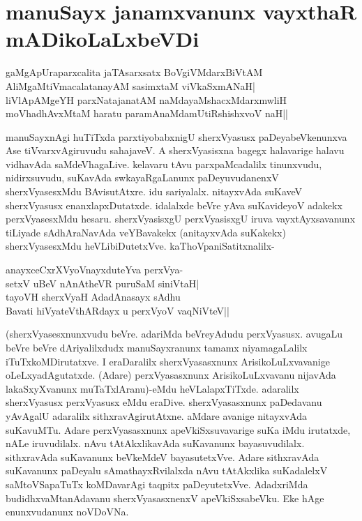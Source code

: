 \chapter{manuSayx janamxvanunx vayxthaR mADikoLaLxbeVDi}\label{chap6}

\begin{shloka}
gaMgApUraparxcalita jaTAsarxsatx BoVgiVMdarxBiVtAM\\
AliMgaMtiVmacalatanayAM sasimxtaM viVkaSxmANaH|\\
liVlApAMgeYH parxNatajanatAM naMdayaMshacxMdarxmwliH\\
moVhadhAvxMtaM haratu paramAnaMdamUtiRshishxvoV naH||
\end{shloka}

manuSayxnAgi huTiTxda parxtiyobabxnigU sherxVyasusx paDeyabeVkenunxva Ase tiVvarxvAgiruvudu sahajaveV. A sherxVyasisxna bagegx halavarige halavu vidhavAda saMdeVhagaLive. kelavaru tAvu parxpaMcadalilx tinunxvudu, nidirxsuvudu, suKavAda swkayaRgaLanunx paDeyuvudanenxV sherxVyasesxMdu BAvisutAtxre. idu sariyalalx. nitayxvAda suKaveV sherxVyasusx enanxlapxDutatxde. idalalxde beVre yAva suKavideyoV adakekx perxVyasesxMdu hesaru. sherxVyasisxgU perxVyasisxgU iruva vayxtAyxsavanunx tiLiyade sAdhAraNavAda veYBavakekx (anitayxvAda suKakekx) sherxVyasesxMdu heVLibiDutetxVve. kaThoVpaniSatitxnalilx-

\begin{shloka}
anayxceCxrXVyoV\s nayxduteYva perxVya-\\
setxV uBeV nAnAtheVR puruSaM siniVtaH|\\
tayoVH sherxVyaH AdadAnasayx sAdhu\\
Bavati hiVyateV\s thARdayx u perxVyoV vaqNiVteV||
\end{shloka}

(sherxVyasesxnunxvudu beVre. adariMda beVreyAdudu perxVyasusx. avugaLu beVre beVre dAriyalilxdudx manuSayxranunx tamamx niyamagaLalilx iTuTxkoMDirutatxve. I eraDaralilx sherxVyasasxnunx ArisikoLuLxvavanige oLeLxyadAgutatxde. (Adare) perxVyasasxnunx ArisikoLuLxvavanu nijavAda lakaSxyXvanunx muTaTxlAranu)-eMdu heVLalapxTiTxde. adaralilx sherxVyasusx perxVyasusx eMdu eraDive. sherxVyasasxnunx paDedavanu yAvAgalU adaralilx sithxravAgirutAtxne. aMdare avanige nitayxvAda suKavuMTu. Adare perxVyasasxnunx apeVkiSxsuvavarige suKa iMdu irutatxde, nALe iruvudilalx. nAvu tAtAkxlikavAda suKavanunx bayasuvudilalx. sithxravAda suKavanunx beVkeMdeV bayasutetxVve. Adare sithxravAda suKavanunx paDeyalu sAmathayxRvilalxda nAvu tAtAkxlika suKadalelxV saMtoVSapaTuTx koMDavarAgi taqpitx paDeyutetxVve. AdadxriMda budidhxvaMtanAdavanu sherxVyasasxnenxV apeVkiSxsabeVku. Eke hAge enunxvudanunx noVDoVNa.

